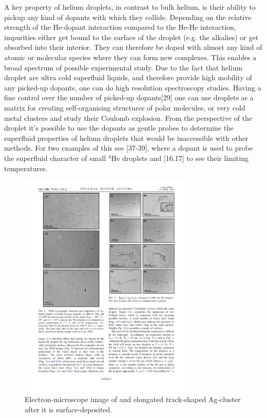 		A key property of helium droplets, in contrast to bulk helium, is their ability to pickup any kind of dopants with which they collide. Depending on the relative strength of the He-dopant interaction compared to the He-He interaction, impurities either get bound to the surface of the droplet (e.g. the alkalies) or get absorbed into their interior. They can therefore be doped with almost any kind of atomic or molecular species where they can form new complexes. This enables a broad spectrum of possible experimental study. Due to the fact that helium droplet are ultra cold superfluid liquids, and therefore provide high mobility of any picked-up dopants, one can do high resolution spectroscopy studies. Having a fine control over the number of picked-up dopants[29] one can use droplets as a matrix for creating self-organising structures of polar molecules, or very cold metal clusters and study their Coulomb explosion. From the perspective of the droplet it's possible to use the dopants as gentle probes to determine the superfluid properties of helium droplets that would be inaccessible with other methods. For two examples of this see [37-39], where a dopant is used to probe the superfluid character of small $^4$He droplets and [16,17] to see their limiting temperatures.\\
		
		\begin{figure}[t]
			\begin{center}
				\includegraphics[width=0.75\textwidth]{silver-filament}
				\caption{Electron-microscope image of and elongated track-shaped Ag-cluster after it is surface-deposited.}
				\label{fig:silver-filament}
			\end{center}
		\end{figure}	
				
